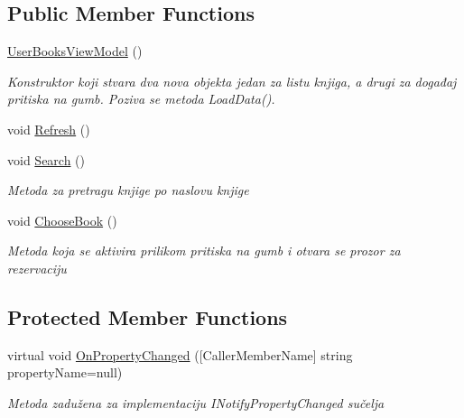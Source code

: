 \subsection*{Public Member Functions}
\begin{DoxyCompactItemize}
\item 
\mbox{\hyperlink{class_easy_library_application_1_1_w_p_f_1_1_view_model_1_1_user_books_view_model_ae2fc49b6721388e02a491684c5f16fd0}{User\+Books\+View\+Model}} ()
\begin{DoxyCompactList}\small\item\em Konstruktor koji stvara dva nova objekta jedan za listu knjiga, a drugi za događaj pritiska na gumb. Poziva se metoda Load\+Data(). \end{DoxyCompactList}\item 
void \mbox{\hyperlink{class_easy_library_application_1_1_w_p_f_1_1_view_model_1_1_user_books_view_model_a2c931fd464e4902a0ba6eb55348df1f3}{Refresh}} ()
\item 
void \mbox{\hyperlink{class_easy_library_application_1_1_w_p_f_1_1_view_model_1_1_user_books_view_model_a4086ca89839e12a62444104c96fa02ff}{Search}} ()
\begin{DoxyCompactList}\small\item\em Metoda za pretragu knjige po naslovu knjige \end{DoxyCompactList}\item 
void \mbox{\hyperlink{class_easy_library_application_1_1_w_p_f_1_1_view_model_1_1_user_books_view_model_a80abd85a6da594ada491cae1353e5ab1}{Choose\+Book}} ()
\begin{DoxyCompactList}\small\item\em Metoda koja se aktivira prilikom pritiska na gumb i otvara se prozor za rezervaciju \end{DoxyCompactList}\end{DoxyCompactItemize}
\subsection*{Protected Member Functions}
\begin{DoxyCompactItemize}
\item 
virtual void \mbox{\hyperlink{class_easy_library_application_1_1_w_p_f_1_1_view_model_1_1_user_books_view_model_ab209852d12dab3ff999230f2510dfe94}{On\+Property\+Changed}} (\mbox{[}Caller\+Member\+Name\mbox{]} string property\+Name=null)
\begin{DoxyCompactList}\small\item\em Metoda zadužena za implementaciju I\+Notify\+Property\+Changed sučelja \end{DoxyCompactList}\end{DoxyCompactItemize}
